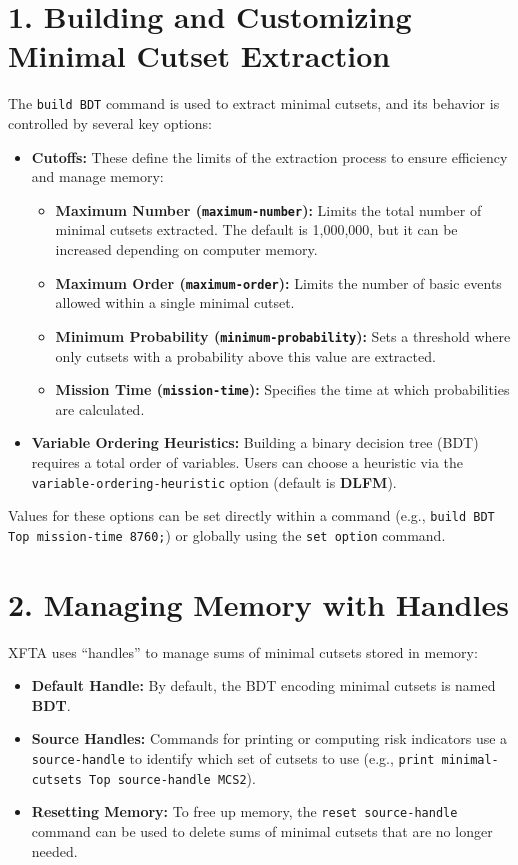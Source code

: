 \section*{1. Building and Customizing Minimal Cutset Extraction}
The \texttt{build BDT} command is used to extract minimal cutsets, and its behavior is controlled by several key options:

\begin{itemize}
    \item \textbf{Cutoffs:} These define the limits of the extraction process to ensure efficiency and manage memory:
    \begin{itemize}
        \item \textbf{Maximum Number (\texttt{maximum-number}):} Limits the total number of minimal cutsets extracted. The default is 1,000,000, but it can be increased depending on computer memory.
        \item \textbf{Maximum Order (\texttt{maximum-order}):} Limits the number of basic events allowed within a single minimal cutset.
        \item \textbf{Minimum Probability (\texttt{minimum-probability}):} Sets a threshold where only cutsets with a probability above this value are extracted.
        \item \textbf{Mission Time (\texttt{mission-time}):} Specifies the time at which probabilities are calculated.
    \end{itemize}
    \item \textbf{Variable Ordering Heuristics:} Building a binary decision tree (BDT) requires a total order of variables. Users can choose a heuristic via the \texttt{variable-ordering-heuristic} option (default is \textbf{DLFM}).
\end{itemize}

Values for these options can be set directly within a command (e.g., \texttt{build BDT Top mission-time 8760;}) or globally using the \texttt{set option} command.

\section*{2. Managing Memory with Handles}
XFTA uses ``handles'' to manage sums of minimal cutsets stored in memory:
\begin{itemize}
    \item \textbf{Default Handle:} By default, the BDT encoding minimal cutsets is named \textbf{BDT}.
    \item \textbf{Source Handles:} Commands for printing or computing risk indicators use a \texttt{source-handle} to identify which set of cutsets to use (e.g., \texttt{print minimal-cutsets Top source-handle MCS2}).
    \item \textbf{Resetting Memory:} To free up memory, the \texttt{reset source-handle} command can be used to delete sums of minimal cutsets that are no longer needed.
\end{itemize}

